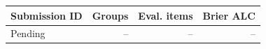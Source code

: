 \begin{tabular}{lrrr}
\toprule
Submission ID & Groups & Eval. items & Brier ALC\\
\midrule
Pending & -- & -- & --\\
\bottomrule
\end{tabular}
